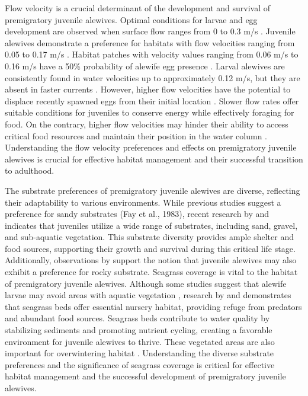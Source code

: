 \documentclass[
]{book}
\begin{document}
Flow velocity is a crucial determinant of the development and survival of premigratory juvenile alewives. Optimal conditions for larvae and egg development are observed when surface flow ranges from 0 to 0.3 m/s \citep{pardue_habitat_1983}. Juvenile alewives demonstrate a preference for habitats with flow velocities ranging from 0.05 to 0.17 m/s \citep{richkus_response_1975}. Habitat patches with velocity values ranging from 0.06 m/s to 0.16 m/s have a 50\% probability of alewife egg presence \citep{oconnell_habitat_1999}. Larval alewives are consistently found in water velocities up to approximately 0.12 m/s, but they are absent in faster currents \citep{ingel_habitat_2013}. However, higher flow velocities have the potential to displace recently spawned eggs from their initial location \citep{able_alewife_2020}. Slower flow rates offer suitable conditions for juveniles to conserve energy while effectively foraging for food. On the contrary, higher flow velocities may hinder their ability to access critical food resources and maintain their position in the water column \citep{haro_swimming_2004}. Understanding the flow velocity preferences and effects on premigratory juvenile alewives is crucial for effective habitat management and their successful transition to adulthood.

The substrate preferences of premigratory juvenile alewives are diverse, reflecting their adaptability to various environments. While previous studies suggest a preference for sandy substrates (Fay et al., 1983), recent research by \citet{able_alewife_2020} and \citet{brown_habitat_2000} indicates that juveniles utilize a wide range of substrates, including sand, gravel, and sub-aquatic vegetation. This substrate diversity provides ample shelter and food sources, supporting their growth and survival during this critical life stage. Additionally, observations by \citet{janssen_preference_2004} support the notion that juvenile alewives may also exhibit a preference for rocky substrate. Seagrass coverage is vital to the habitat of premigratory juvenile alewives. Although some studies suggest that alewife larvae may avoid areas with aquatic vegetation \citep{ingel_habitat_2013}, research by \citet{laney_relationship_1997} and \citet{smith_overlapping_2015} demonstrates that seagrass beds offer essential nursery habitat, providing refuge from predators and abundant food sources. Seagrass beds contribute to water quality by stabilizing sediments and promoting nutrient cycling, creating a favorable environment for juvenile alewives to thrive. These vegetated areas are also important for overwintering habitat \citep{killgore_distribution_1988}. Understanding the diverse substrate preferences and the significance of seagrass coverage is critical for effective habitat management and the successful development of premigratory juvenile alewives.
\end{document}
